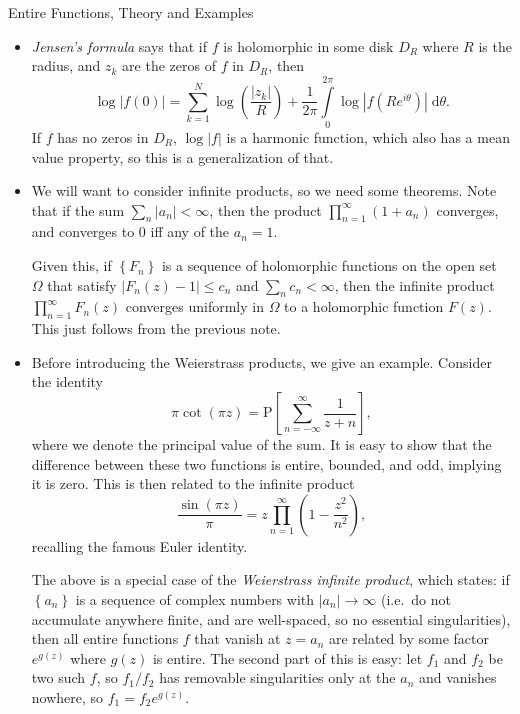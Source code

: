 \documentclass[11pt,
        usenames, %
        dvipsnames %
    ]{report}
\newcommand*{\abs}[1]{\left|#1\right|}
\newcommand*{\p}[1]{\left(#1\right)}
\newcommand*{\s}[1]{\left[#1\right]}
\newcommand*{\z}[1]{\left\{#1\right\}}
\begin{document}
Entire Functions, Theory and Examples
\begin{itemize}
    \item \emph{Jensen's formula} says that if $f$ is holomorphic in some disk
        $D_R$ where $R$ is the radius, and $z_k$ are the zeros of $f$ in $D_R$,
        then
        \begin{equation}
            \log \abs{f(0)} = \sum\limits_{k = 1}^N \log\p{\frac{\abs{z_k}}{R}}
                + \frac{1}{2\pi}\int\limits_{0}^{2 \pi}
                    \log\abs{f\p{Re^{i\theta}}}\;\mathrm{d}\theta.
        \end{equation}
        If $f$ has no zeros in $D_R$, $\log \abs{f}$ is a harmonic function,
        which also has a mean value property, so this is a generalization of
        that.

    \item We will want to consider infinite products, so we need some theorems.
        Note that if the sum $\sum\limits_n \abs{a_n} < \infty$, then the
        product $\prod\limits_{n = 1}^\infty \p{1 + a_n}$ converges, and
        converges to $0$ iff any of the $a_n = 1$.

        Given this, if $\z{F_n}$ is a sequence of holomorphic functions on the
        open set $\Omega$ that satisfy $\abs{F_n(z) - 1} \leq c_n$ and
        $\sum\limits_n c_n < \infty$, then the infinite product $\prod\limits_{n
        = 1}^\infty F_n(z)$ converges uniformly in $\Omega$ to a holomorphic
        function $F(z)$. This just follows from the previous note.

    \item Before introducing the Weierstrass products, we give an example.
        Consider the identity
        \begin{equation}
            \pi \cot \p{\pi z} = \mathrm{P}
                \s{\sum\limits_{n = -\infty}^\infty \frac{1}{z + n}},
        \end{equation}
        where we denote the principal value of the sum. It is easy to show that
        the difference between these two functions is entire, bounded, and odd,
        implying it is zero. This is then related to the infinite product
        \begin{equation}
            \frac{\sin\p{\pi z}}{\pi} = z \prod_{n = 1}^\infty
                \p{1 - \frac{z^2}{n^2}},
        \end{equation}
        recalling the famous Euler identity.

        The above is a special case of the \emph{Weierstrass infinite product},
        which states: if $\z{a_n}$ is a sequence of complex numbers with
        $\abs{a_n} \to \infty$ (i.e.\ do not accumulate anywhere finite, and are
        well-spaced, so no essential singularities), then all entire functions
        $f$ that vanish at $z = a_n$ are related by some factor $e^{g(z)}$ where
        $g(z)$ is entire. The second part of this is easy: let $f_1$ and $f_2$
        be two such $f$, so $f_1 / f_2$ has removable singularities only at the
        $a_n$ and vanishes nowhere, so $f_1 = f_2e^{g(z)}$.


\end{itemize}
\end{document}
